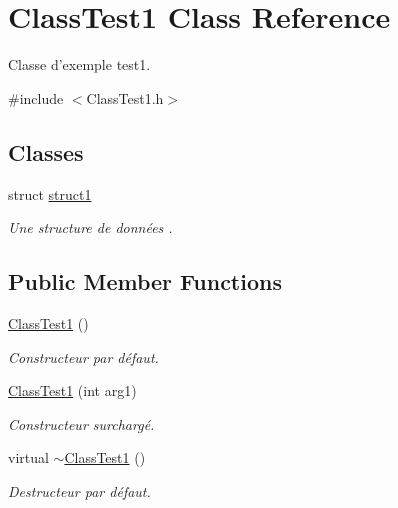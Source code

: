\hypertarget{class_class_test1}{
\section{ClassTest1 Class Reference}
\label{class_class_test1}
}


Classe d'exemple test1.  




{\ttfamily \#include $<$ClassTest1.h$>$}

\subsection*{Classes}
\begin{DoxyCompactItemize}
\item 
struct \hyperlink{struct_class_test1_1_1struct1}{struct1}
\begin{DoxyCompactList}\small\item\em Une structure de données . \item\end{DoxyCompactList}\end{DoxyCompactItemize}
\subsection*{Public Member Functions}
\begin{DoxyCompactItemize}
\item 
\hyperlink{class_class_test1_aae29f18fc50d4e51ea97c37db2c4242b}{ClassTest1} ()
\begin{DoxyCompactList}\small\item\em Constructeur par défaut. \item\end{DoxyCompactList}\item 
\hyperlink{class_class_test1_abea2c07e6d5711284258437da93f968a}{ClassTest1} (int arg1)
\begin{DoxyCompactList}\small\item\em Constructeur surchargé. \item\end{DoxyCompactList}\item 
virtual \hyperlink{class_class_test1_a25805450c67a01271daca6124fbf9705}{$\sim$ClassTest1} ()
\begin{DoxyCompactList}\small\item\em Destructeur par défaut. \item\end{DoxyCompactList}\end{DoxyCompactItemize}
